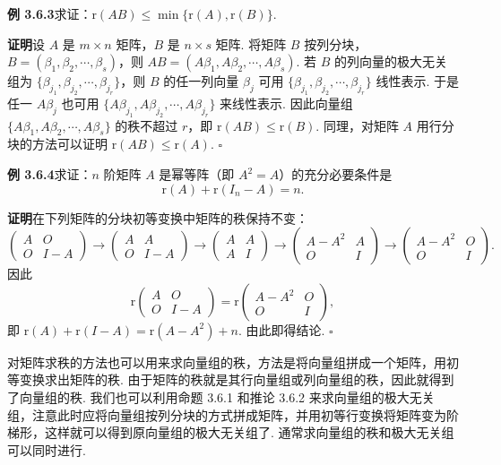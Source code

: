 \documentclass[UTF8,12pt,a4paper,fontset=fandol]{ctexart}
\begin{document}
\noindent\textbf{例 3.6.3}\quad 求证：$\mathrm{r}(AB)\leq \min\{\mathrm{r}(A),\mathrm{r}(B)\}$.

\noindent\textbf{证明}\quad 设 $A$ 是 $m\times n$ 矩阵，$B$ 是 $n\times s$ 矩阵. 将矩阵 $B$ 按列分块，$B=(\beta_1,\beta_2,\cdots,\beta_s)$，则 $AB=(A\beta_1,A\beta_2,\cdots,A\beta_s)$. 若 $B$ 的列向量的极大无关组为 $\{\beta_{j_1},\beta_{j_2},\cdots,\beta_{j_r}\}$，则 $B$ 的任一列向量 $\beta_j$ 可用 $\{\beta_{j_1},\beta_{j_2},\cdots,\beta_{j_r}\}$ 线性表示. 于是任一 $A\beta_j$ 也可用 $\{A\beta_{j_1},A\beta_{j_2},\cdots,A\beta_{j_r}\}$ 来线性表示. 因此向量组 $\{A\beta_1,A\beta_2,\cdots,A\beta_s\}$ 的秩不超过 $r$，即 $\mathrm{r}(AB)\leq \mathrm{r}(B)$. 同理，对矩阵 $A$ 用行分块的方法可以证明 $\mathrm{r}(AB)\leq \mathrm{r}(A)$. $\square$

\noindent\textbf{例 3.6.4}\quad 求证：$n$ 阶矩阵 $A$ 是幂等阵（即 $A^2=A$）的充分必要条件是
\[
\mathrm{r}(A)+\mathrm{r}(I_n-A)=n.
\]

\noindent\textbf{证明}\quad 在下列矩阵的分块初等变换中矩阵的秩保持不变：
\[
\left(\begin{array}{cc}
A&O\\
O&I-A
\end{array}\right)
\to
\left(\begin{array}{cc}
A&A\\
O&I-A
\end{array}\right)
\to
\left(\begin{array}{cc}
A&A\\
A&I
\end{array}\right)
\to
\left(\begin{array}{cc}
A-A^2&A\\
O&I
\end{array}\right)
\to
\left(\begin{array}{cc}
A-A^2&O\\
O&I
\end{array}\right).
\]
因此
\[
\mathrm{r}\left(\begin{array}{cc}
A&O\\
O&I-A
\end{array}\right)
=
\mathrm{r}\left(\begin{array}{cc}
A-A^2&O\\
O&I
\end{array}\right),
\]
即 $\mathrm{r}(A)+\mathrm{r}(I-A)=\mathrm{r}(A-A^2)+n$. 由此即得结论. $\square$

对矩阵求秩的方法也可以用来求向量组的秩，方法是将向量组拼成一个矩阵，用初等变换求出矩阵的秩. 由于矩阵的秩就是其行向量组或列向量组的秩，因此就得到了向量组的秩. 我们也可以利用命题 3.6.1 和推论 3.6.2 来求向量组的极大无关组，注意此时应将向量组按列分块的方式拼成矩阵，并用初等行变换将矩阵变为阶梯形，这样就可以得到原向量组的极大无关组了. 通常求向量组的秩和极大无关组可以同时进行.
\end{document}

